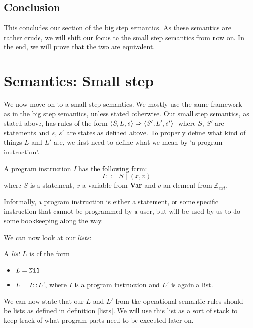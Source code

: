 \subsection{Conclusion}
This concludes our section of the big step semantics. As these semantics are rather crude, we will shift our focus to the small step semantics from now on. In the end, we will prove that the two are equivalent.


\section{Semantics: Small step}
We now move on to a small step semantics. We mostly use the same framework as in the big step semantics, unless stated otherwise. Our small step semantics, as stated above, has rules of the form $\langle S, L, s \rangle \Rightarrow \langle S', L', s' \rangle$, where $S$, $S'$ are statements and $s$, $s'$ are states as defined above. To properly define what kind of things $L$ and $L'$ are, we first need to define what we mean by `a program instruction'. 

\begin{definition}
\label{programinstruction}
A program instruction $I$ has the following form:
$$I ::= S \mid (x,v)$$
where $S$ is a statement, $x$ a variable from \textbf{Var} and $v$ an element from $\mathbb{Z}_{ext}$.
\end{definition}

Informally, a program instruction is either a statement, or some specific instruction that cannot be programmed by a user, but will be used by us to do some bookkeeping along the way. 

We can now look at our \emph{lists}:

\begin{definition}
\label{lists}
A \emph{list} $L$ is of the form 
\begin{itemize}[noitemsep]
    \item $L = \texttt{Nil}$
    \item $L = I::L'$, where $I$ is a program instruction and $L'$ is again a list. 
\end{itemize}
\end{definition}

We can now state that our $L$ and $L'$ from the operational semantic rules should be lists as defined in definition \ref{lists}. We will use this list as a sort of stack to keep track of what program parts need to be executed later on. 


